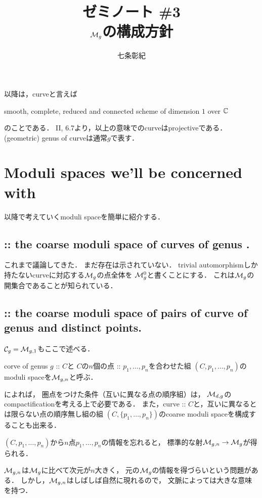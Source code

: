 \documentclass[a4paper]{jsarticle}
\begin{document}
\title{ゼミノート \#3 \\ $\mathcal{M}_g$の構成方針 }
\author{七条彰紀}
\maketitle
    以降は，curveと言えば
    \begin{center}
        smooth, complete, reduced and connected scheme of dimension $1$ over $\mathbb{C}$
    \end{center}
    のことである．
    \cite{HarAG} II, 6.7より，以上の意味でのcurveはprojectiveである．
    (geometric) genus of curveは通常$g$で表す．

\section{ Moduli spaces we'll be concerned with }
    以降で考えていくmoduli spaceを簡単に紹介する．

    \subsection{
        :: the coarse moduli space of curves of genus . }
    これまで議論してきた．
    まだ存在は示されていない．
    trivial automorphismしか持たないcurveに対応する$\mathcal{M}_g$の点全体を
    $\mathcal{M}_g^0$と書くことにする．
    これは$\mathcal{M}_g$の開集合であることが知られている．

    \subsection{
        :: the coarse moduli space of pairs of curve of genus  and  distinct points. }
    $\mathcal{C}_g=\mathcal{M}_{g,1}$もここで述べる．

    corve of genus $g$ :: $C$と
    $C$の$n$個の点 :: $p_1,\dots, p_n$を合わせた組
    $(C, p_1,\dots, p_n)$のmoduli spaceを$\mathcal{M}_{g,n}$と呼ぶ．

    \cite{HaMo}によれば，
    圏点をつけた条件（互いに異なる点の順序組）は，
    $\mathcal{M}_{d,g}$のcompactificationを考える上で必要である．
    また，curve :: $C$と，互いに異なるとは限らない点の順序無し組の組
    $(C, \{p_1,\dots,p_n\})$のcoarse moduli spaceを構成することも出来る．

    $(C, p_1,\dots,p_n)$から$n$点$p_1,\dots,p_n$の情報を忘れると，
    標準的な射$\mathcal{M}_{g,n} \to \mathcal{M}_g$が得られる．

    $\mathcal{M}_{g,n}$は$\mathcal{M}_g$に比べて次元が$n$大きく，
    元の$\mathcal{M}_g$の情報を得づらいという問題がある．
    しかし，$\mathcal{M}_{g,n}$はしばしば自然に現れるので，
    文脈によっては大きな意味を持つ．
\end{document}

